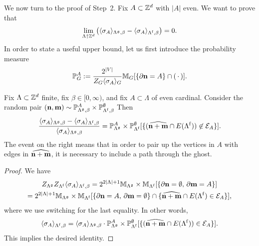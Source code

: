 We now turn to the proof of Step~2. Fix $A\subset\mathbb Z^d$
with $|A|$ even.
We want to prove that
\begin{equation}
    \label{eq:continuity_target_limit}
    \lim_{\Lambda\uparrow\Z^d}
    \left(
        \langle\sigma_A\rangle_{\Lambda^\frakg,\beta}
        -\langle\sigma_A\rangle_{\Lambda^\f,\beta}
    \right)
    =
    0.
\end{equation}
In order to state a useful upper bound,
let us first introduce the probability measure
\[
    \mathbb P_{G}^A:=\frac{2^{|V|}}{Z_G \langle\sigma_A\rangle_G} \mathbb M_G[\{\partial\mathbf{n}=A\}\cap(\,\cdot\,)].
\]

\begin{lemma}
    Fix $\Lambda\subset\mathbb Z^d$ finite, fix $\beta\in[0,\infty)$,
    and fix $A\subset\Lambda$ of even cardinal.
    Consider the random pair $(\mathbf{n},\mathbf{m})\sim
    \mathbb P_{\Lambda^\mathfrak g,\beta}^A\times\mathbb P_{\Lambda^{\operatorname{f}},\beta}^\emptyset$
    Then
    \begin{equation}
        \frac{
            \langle\sigma_A\rangle_{\Lambda^\mathfrak g,\beta}
            -\langle\sigma_A\rangle_{\Lambda^{\operatorname{f}},\beta}
        }{
            \langle\sigma_A\rangle_{\Lambda^\mathfrak g,\beta}
        }
        =
        \mathbb P_{\Lambda^\mathfrak g}^A\times\mathbb P_{\Lambda^{\operatorname{f}}}^\emptyset
        [\{(\widehat{\mathbf{n}+\mathbf{m}}\cap E(\Lambda^{\operatorname{f}}))\not\in\mathcal E_A\}].
    \end{equation}
    The event on the right means that in order to pair up the vertices in $A$
    with edges in $\widehat{\mathbf{n}+\mathbf{m}}$,
    it is necessary to include a path through the ghost.
\end{lemma}

\begin{proof}
    We have
    \begin{multline}
        Z_{\Lambda^\mathfrak g}Z_{\Lambda^{\operatorname{f}}}\langle\sigma_A\rangle_{\Lambda^{\operatorname{f}},\beta}=
        2^{2|\Lambda|+1}\mathbb M_{\Lambda^\mathfrak g}\times\mathbb M_{\Lambda^{\operatorname{f}}}[\{\partial\mathbf{n}=\emptyset,\,\partial\mathbf{m}=
        A\}]
        \\
        =
        2^{2|\Lambda|+1}\mathbb M_{\Lambda^\mathfrak g}\times\mathbb M_{\Lambda^{\operatorname{f}}}[\{\partial\mathbf{n}=A,\,\partial\mathbf{m}=
        \emptyset\}\cap\{\widehat{\mathbf{n}+\mathbf{m}}\cap E(\Lambda^{\operatorname{f}})\in\mathcal E_A\}],
    \end{multline}
    where we use switching for the last equality.
    In other words,
    \[
        \langle\sigma_A\rangle_{\Lambda^{\operatorname{f}},\beta}=
        \langle\sigma_A\rangle_{\Lambda^\mathfrak g,\beta}\cdot
        \mathbb P_{\Lambda^\mathfrak g}^A\times\mathbb P_{\Lambda^{\operatorname{f}}}^\emptyset
        [\{(\widehat{\mathbf{n}+\mathbf{m}}\cap E(\Lambda^{\operatorname{f}}))\in\mathcal E_A\}].
    \]
    This implies the desired identity.
\end{proof}

